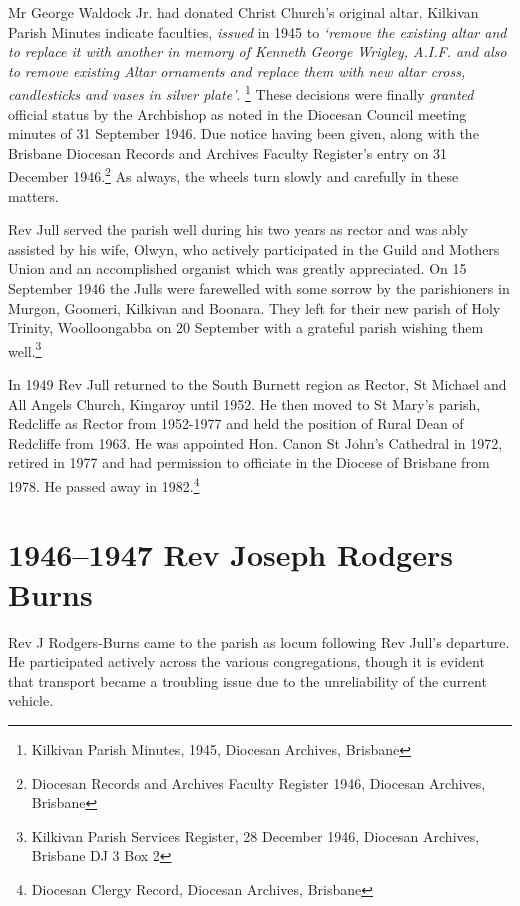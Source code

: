 Mr George Waldock Jr. had donated Christ Church's original altar. Kilkivan Parish Minutes indicate faculties, \emph{issued} in 1945 to \emph{`remove the existing altar and to replace it with another in memory of Kenneth George Wrigley, A.I.F. and also to remove existing Altar ornaments and replace them with new altar cross, candlesticks and vases in silver plate'}. \footnote{Kilkivan Parish Minutes, 1945, Diocesan Archives, Brisbane} These decisions were finally \emph{granted} official status by the Archbishop as noted in the Diocesan Council meeting minutes of 31 September 1946. Due notice having been given, along with the Brisbane Diocesan Records and Archives Faculty Register's entry on 31 December 1946.\footnote{Diocesan Records and Archives Faculty Register 1946, Diocesan Archives, Brisbane} As always, the wheels turn slowly and carefully in these matters.


Rev Jull served the parish well during his two years as rector and was ably assisted by his wife, Olwyn, who actively participated in the Guild and Mothers Union and an accomplished organist which was greatly appreciated. On 15 September 1946 the Julls were farewelled with some sorrow by the parishioners in Murgon, Goomeri, Kilkivan and Boonara. They left for their new parish of Holy Trinity, Woolloongabba on 20 September with a grateful parish wishing them well.\footnote{Kilkivan Parish Services Register, 28 December 1946, Diocesan Archives, Brisbane DJ 3 Box 2}


In 1949 Rev Jull returned to the South Burnett region as Rector, St Michael and All Angels Church, Kingaroy until 1952. He then moved to St Mary's parish, Redcliffe as Rector from 1952-1977 and held the position of Rural Dean of Redcliffe from 1963. He was appointed Hon. Canon St John's Cathedral in 1972, retired in 1977 and had permission to officiate in the Diocese of Brisbane from 1978. He passed away in 1982.\footnote{Diocesan Clergy Record, Diocesan Archives, Brisbane}


\section{1946--1947 Rev Joseph Rodgers Burns}



Rev J Rodgers-Burns came to the parish as locum following Rev Jull's departure. He participated actively across the various congregations, though it is evident that transport became a troubling issue due to the unreliability of the current vehicle.



